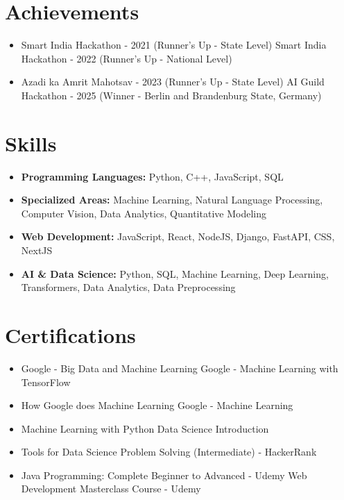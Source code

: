 \documentclass[a4paper,10pt]{article}
\begin{document}
\section*{Achievements}
\begin{itemize}
\item Smart India Hackathon - 2021 (Runner's Up - State Level) \hfill Smart India Hackathon - 2022 (Runner's Up - National Level)
\item Azadi ka Amrit Mahotsav - 2023 (Runner's Up - State Level) \hfill AI Guild Hackathon - 2025 (Winner - Berlin and Brandenburg State, Germany)
\end{itemize}

\section*{Skills}
\begin{itemize}
  \item \textbf{Programming Languages:} Python, C++, JavaScript, SQL
  \item \textbf{Specialized Areas:} Machine Learning, Natural Language Processing, Computer Vision, Data Analytics, Quantitative Modeling
  \item \textbf{Web Development:} JavaScript, React, NodeJS, Django, FastAPI, CSS, NextJS
  \item \textbf{AI \& Data Science:} Python, SQL, Machine Learning, Deep Learning, Transformers, Data Analytics, Data Preprocessing
\end{itemize}

\section*{Certifications}
\begin{itemize}
\item Google - Big Data and Machine Learning \hfill Google - Machine Learning with TensorFlow
\item How Google does Machine Learning \hfill Google - Machine Learning
\item Machine Learning with Python \hfill Data Science Introduction
\item Tools for Data Science \hfill Problem Solving (Intermediate) - HackerRank
\item Java Programming: Complete Beginner to Advanced - Udemy \hfill Web Development Masterclass Course - Udemy
\end{itemize}
\end{document}
